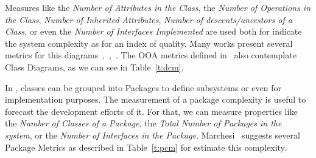 Measures like the \emph{Number of Attributes in the Class}, the \emph{Number of Operations in the Class}, \emph{Number of Inherited Attributes}, \emph{Number of descents/ancestors of a Class}, or even the \emph{Number of Interfaces Implemented} are used both for indicate the system complexity as for an index of quality.
Many works present several metrics for this diagrams~\cite{DBLP:journals/Lobjet/GeneroPC00},~\cite{Eichelberger_onclass},~\cite{Yi04acomparison}.
The OOA metrics defined in~\cite{Marchesi:1998:OMU:522081.795010} also contemplate Class Diagrams, as we can see in Table~\ref{t:dcm}.


In \uml, classes can be grouped into Packages to define subsystems or even for implementation purposes.
The measurement of a package complexity is useful to forecast the development efforts of it.
For that, we can measure properties like the \emph{Number of Classes of a Package}, the \emph{Total Number of Packages in the system}, or the \emph{Number of Interfaces in the Package}.
Marchesi~\cite{Marchesi:1998:OMU:522081.795010} suggests several Package Metrics as described in Table~\ref{t:pcm} for estimate this complexity.

